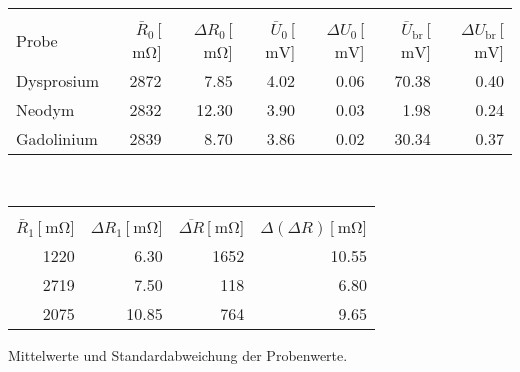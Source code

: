 
\begin{table}[!h]
\begin{center}
\begin{tabular}{|l|r|r|r|r|r|r|}
\hline
 & & & & & & \\
Probe & $\bar R_\mathrm{0}$\,[$\SI{}{\milli\ohm}$]& $\Delta R_\mathrm{0}$\,[$\SI{}{\milli\ohm}$] & $\bar U_\mathrm{0}$\,[$\SI{}{\milli\volt}$] & $\Delta U_\mathrm{0}$\,[$\SI{}{\milli\volt}$] & $\bar U_\mathrm{br}$\,[$\SI{}{\milli\volt}$] & $\Delta U_\mathrm{br}$\,[$\SI{}{\milli\volt}$]\\
\hline
\hline

Dysprosium & 2872 & 7.85  & 4.02 & 0.06 & 70.38 & 0.40\\
Neodym     & 2832 & 12.30 & 3.90 & 0.03 & 1.98  & 0.24\\
Gadolinium & 2839 & 8.70  & 3.86 & 0.02 & 30.34 & 0.37\\

\hline
\end{tabular}
\end{center}
\begin{center}
\begin{tabular}{|r|r|r|r|}
\hline
&&&\\
$\bar R_\mathrm{1}$\,[$\SI{}{\milli\ohm}$] & $\Delta R_\mathrm{1}$\,[$\SI{}{\milli\ohm}$] & $\overline{\Delta R}$\,[$\SI{}{\milli\ohm}$] & $\Delta(\Delta R)$\,[$\SI{}{\milli\ohm}$]\\
\hline
\hline
1220 & 6.30  & 1652 & 10.55\\
2719 & 7.50  & 118  & 6.80\\
2075 & 10.85 & 764  & 9.65\\
\hline
\end{tabular}
\caption\,{Mittelwerte und Standardabweichung der Probenwerte.}
\label{Mittelwerte}
\end{center}
\end{table}